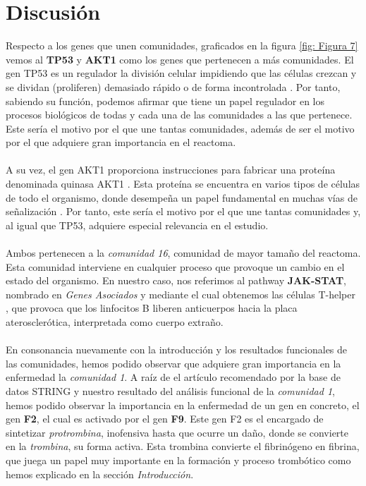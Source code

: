 \section{Discusión}
\hfill


\hfill

Respecto a los genes que unen comunidades, graficados en la figura \ref*{fig: Figura 7} vemos al \textbf{TP53} y \textbf{AKT1} como los genes que pertenecen a más comunidades. El gen TP53 es un regulador la división celular impidiendo que las células crezcan y se dividan (proliferen) demasiado rápido o de forma incontrolada \cite{TP53}. Por tanto, sabiendo su función, podemos afirmar que tiene un papel regulador en los procesos biológicos de todas y cada una de las comunidades a las que pertenece. Este sería el motivo por el que une tantas comunidades, además de ser el motivo por el que adquiere gran importancia en el reactoma.\\\\  A su vez, el gen AKT1 proporciona instrucciones para fabricar una proteína denominada quinasa AKT1 \cite{AKT1}. Esta proteína se encuentra en varios tipos de células de todo el organismo, donde desempeña un papel fundamental en muchas vías de señalización \cite{AKT1}. Por tanto, este sería el motivo por el que une tantas comunidades y, al igual que TP53, adquiere especial relevancia en el estudio.\\\\
Ambos pertenecen a la \textit{comunidad 16}, comunidad de mayor tamaño del reactoma. Esta comunidad interviene en cualquier proceso que provoque un cambio en el estado del organismo. En nuestro caso, nos referimos al pathway \textbf{JAK-STAT}, nombrado en \textit{Genes Asociados} y mediante el cual obtenemos las células T-helper \cite{pathway}, que provoca que los linfocitos B liberen anticuerpos hacia la placa aterosclerótica, interpretada como cuerpo extraño.\\\\
En consonancia nuevamente con la introducción y los resultados funcionales de las comunidades, hemos podido observar que adquiere gran importancia en la enfermedad la \textit{comunidad 1}. A raíz de el artículo recomendado \cite{F2_F9} por la base de datos STRING \cite{STRING}  y nuestro resultado del análisis funcional de la \textit{comunidad 1}, hemos podido observar la importancia en la enfermedad de un gen en concreto, el gen \textbf{F2}, el cual es activado por el gen \textbf{F9}. Este gen F2 es el encargado de sintetizar \textit{protrombina}, inofensiva hasta que ocurre un daño, donde se convierte en la \textit{trombina}, su forma activa. Esta trombina convierte el fibrinógeno en fibrina, que juega un papel muy importante en la formación y proceso trombótico como hemos explicado en la sección \textit{Introducción}.\\\\

